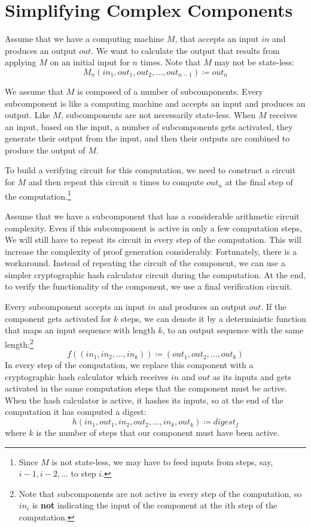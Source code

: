 \pagebreak


\section{Simplifying Complex Components}\label{sec:simplifying-complex-components}

Assume that we have a computing machine $M$, that accepts an input $in$ and produces an output $out$. We want to
calculate the output that results from applying $M$ on an initial input for $n$ times. Note that
$M$ may not be state-less:
\[
    M_n(in_1, out_1, out_2,\dots,out_{n-1}) \coloneqq out_n
\]

We assume that $M$ is composed of a number of subcomponents. Every subcomponent is like a computing machine and accepts
an input and produces an output. Like $M$, subcomponents are not necessarily state-less. When $M$ receives an input,
based on the input, a number of subcomponents gets activated, they generate their output from the input, and then
their outputs are combined to produce the output of $M$.

To build a verifying circuit for this computation, we need to construct a circuit for $M$ and then repeat this circuit
$n$ times to compute $out_n$ at the final step of the computation.\footnote{Since $M$ is not state-less, we may have
to feed inputs from steps, say, $i-1,i-2,\dots$ to step $i$.}

Assume that we have a subcomponent that has a considerable arithmetic circuit complexity. Even if this subcomponent is
active in only a few computation steps, We will still have to repeat its circuit in every step of the computation. This
will increase the complexity of proof generation considerably. Fortunately, there is a workaround. Instead of
repeating the circuit of the component, we can use a simpler cryptographic hash calculator circuit during the
computation. At the end, to verify the functionality of the component, we use a final verification circuit.

Every subcomponent accepts an input $in$ and produces an output $out$. If the component gets activated for $k$ steps, we
can denote it by a deterministic function that maps an input sequence with length $k$, to an output sequence with the
same length:\footnote{Note that subcomponents are not active in every step of the computation, so $in_i$ is \textbf{not}
indicating the input of the component at the $i$th step of the computation.}
\[
    f((in_1,in_2,\dots,in_k)) \coloneqq (out_1,out_2,\dots,out_k)
\]
In every step of the computation, we replace this component with a cryptographic hash calculator which receives $in$ and
$out$ as its inputs and gets activated in the same computation steps that the component must be active. When the
hash calculator is active, it hashes its inputs, so at the end of the computation it has computed a digest:
\[
    h(in_1,out_1,in_2,out_2,\dots,in_k,out_k) \coloneqq digest_f
\]
where $k$ is the number of steps that our component must have been active.

